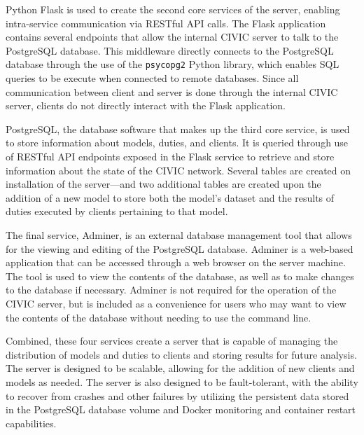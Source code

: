 \documentclass[11pt]{article}
\begin{document}
Python Flask is used to create the second core services of the server, enabling intra-service communication via RESTful API calls. The Flask application contains several endpoints that allow the internal CIVIC server to talk to the PostgreSQL database. This middleware directly connects to the PostgreSQL database through the use of the \verb|psycopg2| Python library, which enables SQL queries to be execute when connected to remote databases. Since all communication between client and server is done through the internal CIVIC server, clients do not directly interact with the Flask application. 

PostgreSQL, the database software that makes up the third core service, is used to store information about models, duties, and clients. It is queried through use of RESTful API endpoints exposed in the Flask service to retrieve and store information about the state of the CIVIC network. Several tables are created on installation of the server---and two additional tables are created upon the addition of a new model to store both the model's dataset and the results of duties executed by clients pertaining to that model. 

The final service, Adminer, is an external database management tool that allows for the viewing and editing of the PostgreSQL database. Adminer is a web-based application that can be accessed through a web browser on the server machine. The tool is used to view the contents of the database, as well as to make changes to the database if necessary. Adminer is not required for the operation of the CIVIC server, but is included as a convenience for users who may want to view the contents of the database without needing to use the command line.

Combined, these four services create a server that is capable of managing the distribution of models and duties to clients and storing results for future analysis. The server is designed to be scalable, allowing for the addition of new clients and models as needed. The server is also designed to be fault-tolerant, with the ability to recover from crashes and other failures by utilizing the persistent data stored in the PostgreSQL database volume and Docker monitoring and container restart capabilities.
\end{document}
